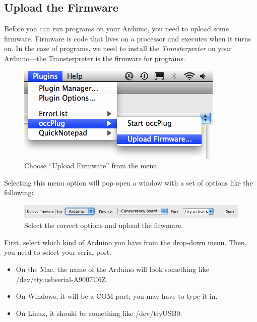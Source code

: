 \subsection{Upload the Firmware}
Before you can run \occam programs on your Arduino, you need to upload some firmware. {\strong Firmware} is code that lives on a processor and executes when it turns on. In the case of \occam programs, we need to install the {\em Transterpreter} on your Arduino---the Transterpreter is the firmware for \occam programs. 

\begin{figure}[!ht]
	\centering
		\includegraphics[width=0.6\linewidth]{images/20110115-upload-firmware}
	\caption{Choose ``Upload Firmware'' from the \occplug menu.}
	\label{images:20110115-upload-firmware}
\end{figure}

Selecting this menu option will pop open a window with a set of options like the following:

\begin{figure}[!ht]
	\centering
		\includegraphics[width=0.9\linewidth]{images/20110115-upload-firmware-window}
	\caption{Select the correct options and upload the firwmare.}
	\label{images:20110115-upload-firmware-window}
\end{figure}

First, select which kind of Arduino you have from the drop-down menu. Then, you need to select your serial port.

\begin{itemize}
	\item On the Mac, the name of the Arduino will look something like {\code /dev/tty.usbserial-A9007U6Z}. 
	\item On Windows, it will be a COM port; you may have to type it in.
	\item On Linux, it should be something like {\code /dev/ttyUSB0}.
\end{itemize}

\newpage

